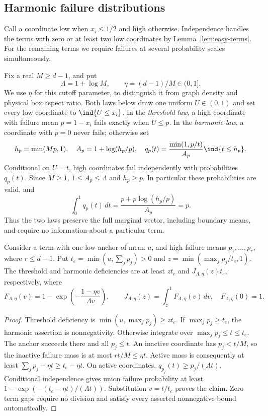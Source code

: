 \subsection{Harmonic failure distributions}
Call a coordinate low when $x_i\le1/2$ and high otherwise. Independence
handles the terms with zero or at least two low coordinates by
Lemma~\ref{lem:easy-terms}. For the remaining terms we require failures
at several probability scales simultaneously.

Fix a real $M\ge d-1$, and put
\begin{equation}\label{eq:harmonic-parameters}
 \Lambda=1+\log M,\qquad \eta=(d-1)/M\in(0,1].
\end{equation}
We use $\eta$ for this cutoff parameter, to distinguish it from graph
density and physical box aspect ratio. Both laws below draw one uniform
$U\in(0,1)$ and set every low coordinate to $\ind\{U\le x_i\}$.
In the \emph{threshold law}, a high coordinate with failure mean
$p=1-x_i$ fails exactly when $U\le p$. In the \emph{harmonic law}, a
coordinate with $p=0$ never fails; otherwise set
\begin{equation}\label{eq:harmonic-law}
 h_p=\min(Mp,1),\quad A_p=1+\log(h_p/p),\quad
 q_p(t)=\frac{\min(1,p/t)}{A_p}\ind\{t\le h_p\}.
\end{equation}
Conditional on $U=t$, high coordinates fail independently with
probabilities $q_p(t)$. Since $M\ge1$, $1\le A_p\le\Lambda$ and
$h_p\ge p$. In particular these probabilities are valid, and
\[
 \int_0^1q_p(t)\,dt
 =\frac{p+p\log(h_p/p)}{A_p}=p.
\]
Thus the two laws preserve the full marginal vector, including boundary
means, and require no information about a particular term.

\begin{lemma}\label{lem:harmonic-curve}
Consider a term with one low anchor of mean $u$, and high failure means
$p_1,\ldots,p_r$, where $r\le d-1$. Put
$t_e=\min(u,\sum_jp_j)>0$ and $z=\min(\max_jp_j/t_e,1)$. The threshold
and harmonic deficiencies are at least $zt_e$ and $J_{\Lambda,\eta}(z)t_e$,
respectively, where
\begin{equation}\label{eq:harmonic-integral}
 F_{\Lambda,\eta}(v)=1-\exp\left(-\frac{1-\eta v}{\Lambda v}\right),
 \qquad J_{\Lambda,\eta}(z)=\int_z^1 F_{\Lambda,\eta}(v)\,dv,
 \quad F_{\Lambda,\eta}(0)=1.
\end{equation}
\end{lemma}
\begin{proof}
Threshold deficiency is $\min(u,\max_jp_j)\ge zt_e$. If
$\max_jp_j\ge t_e$, the harmonic assertion is nonnegativity. Otherwise
integrate over $\max_jp_j\le t\le t_e$. The anchor succeeds there and
all $p_j\le t$. An inactive coordinate has $p_j<t/M$, so the inactive
failure mass is at most $rt/M\le\eta t$. Active mass is consequently at
least $\sum_jp_j-\eta t\ge t_e-\eta t$. On active coordinates,
$q_{p_j}(t)\ge p_j/(\Lambda t)$. Conditional independence gives union
failure probability at least
$1-\exp(-(t_e-\eta t)/(\Lambda t))$. Substitution $v=t/t_e$ proves the
claim. Zero term gaps require no division and satisfy every asserted
nonnegative bound automatically.
\end{proof}

